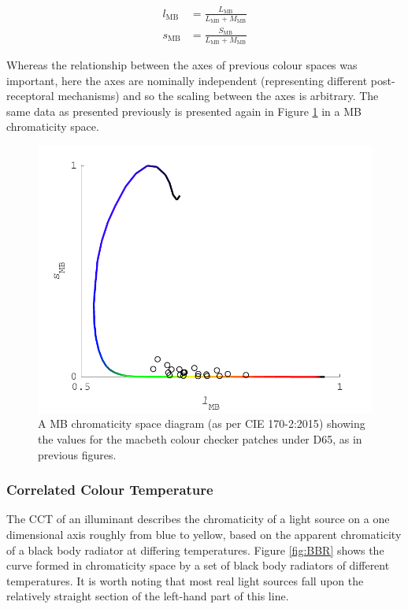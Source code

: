 \begin{subequations}
\begin{align}
l_{\text{MB}}&= \frac{L_{\text{MB}}}{L_{\text{MB}}+M_{\text{MB}}} \\ 
s_{\text{MB}}&= \frac{S_{\text{MB}}}{L_{\text{MB}}+M_{\text{MB}}} 
\end{align}
\label{eq:MB}
\end{subequations}

Whereas the relationship between the axes of previous colour spaces was important, here the axes are nominally independent (representing different post-receptoral mechanisms) and so the scaling between the axes is arbitrary. The same data as presented previously is presented again in Figure \ref{fig:lrMB} in a \gls{MB} chromaticity space.

\begin{figure}[htbp]
\includegraphics[max width=\textwidth]{figs/LitRev/ColorimetryDemo5.pdf}
\caption{A \gls{MB} chromaticity space diagram (as per \gls{CIE} 170-2:2015\citep{cie_cie_2015}) showing the values for the macbeth colour checker patches under D65, as in previous figures.}
\label{fig:lrMB}
\end{figure}

\subsubsection{Correlated Colour Temperature}

The \acrfull{CCT} of an illuminant describes the chromaticity of a light source on a one dimensional axis roughly from blue to yellow, based on the apparent chromaticity of a black body radiator at differing temperatures. Figure \ref{fig:BBR} shows the curve formed in chromaticity space by a set of black body radiators of different temperatures. It is worth noting that most real light sources fall upon the relatively straight section of the left-hand part of this line.

